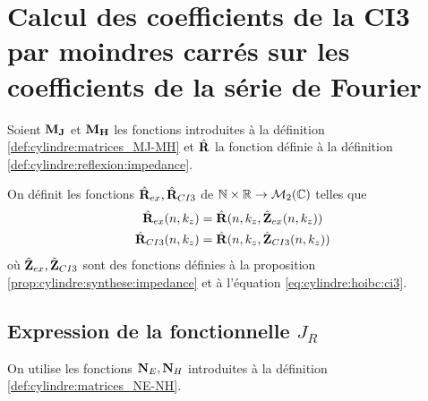 \section{Calcul des coefficients de la CI3 par moindres carrés sur les coefficients de la série de Fourier}

  Soient \(\mathbf{M}_{\mathbf{J}}\) et \(\mathbf{M}_{\mathbf{H}}\) les fonctions introduites à la définition \ref{def:cylindre:matrices_MJ-MH} et \(\hat{\mathbf{R}}\) la fonction définie à la définition \ref{def:cylindre:reflexion:impedance}.

  \begin{defn}%
    \label{def:cylindre:minimisation:matrices_MR}
    On définit les fonctions \(\hat{\mathbf{R}}_{ex}, \hat{\mathbf{R}}_{CI3}\) de \(\mathbb N\times\mathbb R  \rightarrow \mathcal{M}_2(\mathbb C)\) telles que
    \begin{align*}
      \hat{\mathbf{R}}_{ex}(n,k_z) &= \hat{\mathbf{R}}(n,k_z, \hat{\mathbf{Z}}_{ex}(n,k_z))
      \\
      \hat{\mathbf{R}}_{CI3}(n,k_z) &= \hat{\mathbf{R}}(n,k_z, \hat{\mathbf{Z}}_{CI3}(n,k_z))
    \end{align*}
    où \(\hat{\mathbf{Z}}_{ex},\hat{\mathbf{Z}}_{CI3}\) sont des fonctions définies à la proposition \ref{prop:cylindre:synthese:impedance} et à l'équation \eqref{eq:cylindre:hoibc:ci3}.
  \end{defn}

  \subsection[Expression de la fonctionnelle JR]{Expression de la fonctionnelle \(J_R\)}

    On utilise les fonctions \(\mathbf{N}_E, \mathbf{N}_H\) introduites à la définition \ref{def:cylindre:matrices_NE-NH}.

